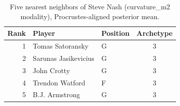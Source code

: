 \begin{table}[htbp]
  \centering\small
  \begin{tabular}{rllc}
    \toprule
    Rank & Player & Position & Archetype \\
    \midrule
    1 & Tomas Satoransky & G & 3 \\
    2 & Sarunas Jasikevicius & G & 3 \\
    3 & John Crotty & G & 3 \\
    4 & Trendon Watford & F & 3 \\
    5 & B.J. Armstrong & G & 3 \\
    \bottomrule
  \end{tabular}
  \caption{Five nearest neighbors of Steve Nash (curvature_m2 modality), Procrustes-aligned posterior mean.}
  \label{tab:Steve_Nash_neighbors_curvature_m2}
\end{table}

